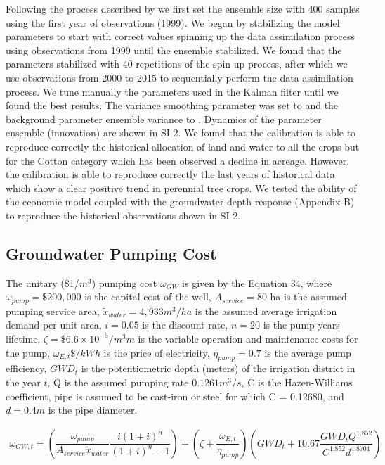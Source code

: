 \documentclass[11pt,a4paper]{article}
\begin{document}
Following the process described by \textcite{maneta_satellite-driven_2020} we first set the ensemble size with 400 samples using the first year of observations (1999). We began by stabilizing the model parameters to start with correct values spinning up the data assimilation process using observations from 1999 until the ensemble stabilized. We found that the parameters stabilized with 40 repetitions of the spin up process, after which we use observations from 2000 to 2015 to sequentially perform the data assimilation process. We tune manually the parameters used in the Kalman filter until we found the best results. The variance smoothing parameter was set to and the background parameter ensemble variance to . Dynamics of the parameter ensemble (innovation) are shown in SI 2. We found that the calibration is able to reproduce correctly the historical allocation of land and water to all the crops but for the Cotton category which has been observed a decline in acreage. However, the calibration is able to reproduce correctly the last years of historical data which show a clear positive trend in perennial tree crops. We tested the ability of the economic model coupled with the groundwater depth response (Appendix B) to reproduce the historical observations shown in SI 2.   

\subsection{Groundwater Pumping Cost}

The unitary (\$1/$m^3$) pumping cost $\omega_{GW}$ is given by the Equation 34, where $\omega_{pump}= \$200,000$ is the capital cost of the well, $A_{service}=80$ ha is the assumed pumping service area, $\widetilde{x}_{water}=4,933 m^3/ ha$ is the assumed average irrigation demand per unit area, $i=0.05$ is the discount rate, $n=20$ is the pump years lifetime, $\zeta= \$6.6\times10^{-5} /m^3 m$ is the variable operation and maintenance costs for the pump, $\omega_{E,t} \$/kWh$ is the price of electricity, $\eta_{pump}=0.7$ is the average pump efficiency, $GWD_t$ is the potentiometric depth (meters) of the irrigation district in the year $t$, Q is the assumed pumping rate $0.1261 m^3/s$, C is the Hazen-Williams coefficient, pipe is assumed to be cast-iron or steel for which C = 0.12680, and $d=0.4 m$ is the pipe diameter.

\begin{equation}
\begin{gathered}
\omega_{GW,t} = \left( \dfrac{\omega_{pump}}{A_{service} \widetilde{x}_{water}} \dfrac{i(1+i)^n}{(1+i)^n-1}\right) 
+ \left(\zeta+\dfrac{\omega_{E,t}}{\eta_{pump}} \right) \left(GWD_t +10.67  \dfrac{GWD_t Q^{1.852}}{C^{1.852} d^{4.8704}}\right)
\end{gathered}
\end{equation}            
\end{document}
